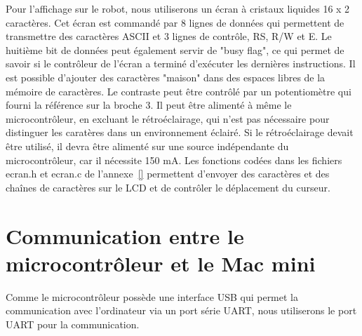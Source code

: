 Pour l'affichage sur le robot, nous utiliserons un écran à cristaux liquides 16 x 2  caractères. Cet écran est commandé par 8 lignes de données qui permettent de transmettre des caractères ASCII et 3 lignes de contrôle, RS, R/W et E. Le huitième bit de données peut également servir de "busy flag", ce qui permet de savoir si le contrôleur de l'écran a terminé d'exécuter les dernières instructions. Il est possible d'ajouter des caractères "maison" dans des espaces libres de la mémoire de caractères. Le contraste peut être contrôlé par un potentiomètre qui fourni la référence sur la broche 3. Il peut être alimenté à même le microcontrôleur, en excluant le rétroéclairage, qui n'est pas nécessaire pour distinguer les caratères dans un environnement éclairé. Si le rétroéclairage devait être utilisé, il devra être alimenté sur une source indépendante du microcontrôleur, car il nécessite 150 mA. Les fonctions codées dans les fichiers ecran.h et ecran.c de l'annexe~\ref{} permettent d'envoyer des caractères et des chaînes de caractères sur le LCD et de contrôler le déplacement du curseur.

\section{Communication entre le microcontrôleur et le Mac mini} \label{s:comm_mac_micro}

Comme le microcontrôleur possède une interface USB qui permet la communication avec l'ordinateur via un port série UART, nous utiliserons le port UART pour la communication. 

